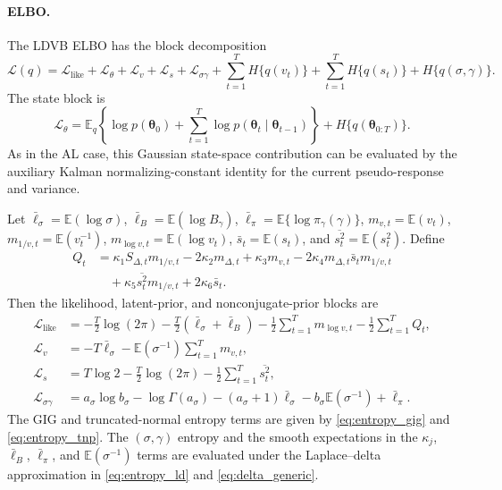 \documentclass[nojss,noheadings]{jss}
\renewcommand{\E}{\mathbb{E}}
\newcommand{\vect}[1]{\bm{#1}}
\newcommand{\elbo}{\mathcal{L}}
\newcommand{\pigamma}{\pi_\gamma}
\begin{document}
\paragraph{ELBO.}
The LDVB ELBO has the block decomposition
\begin{equation}
\elbo(q)=
\elbo_{\mathrm{like}}+\elbo_\theta+\elbo_v+\elbo_s+\elbo_{\sigma\gamma}
+\sum_{t=1}^TH\{q(v_t)\}
+\sum_{t=1}^TH\{q(s_t)\}
+H\{q(\sigma,\gamma)\}.
\label{eq:dyn_exdqlm_elbo}
\end{equation}
The state block is
\begin{equation}
\elbo_\theta
=\E_q\left\{\log p(\vect{\theta}_0)
+\sum_{t=1}^T\log p(\vect{\theta}_t\mid\vect{\theta}_{t-1})\right\}
+H\{q(\vect{\theta}_{0:T})\}.
\label{eq:dyn_exdqlm_elbo_theta}
\end{equation}
As in the AL case, this Gaussian state-space contribution can be evaluated by
the auxiliary Kalman normalizing-constant identity for the current
pseudo-response and variance.

Let
$\bar\ell_\sigma=\E(\log\sigma)$,
$\bar\ell_B=\E(\log B_\gamma)$,
$\bar\ell_{\pi}=\E\{\log\pigamma(\gamma)\}$,
$m_{v,t}=\E(v_t)$, $m_{1/v,t}=\E(v_t^{-1})$,
$m_{\log v,t}=\E(\log v_t)$, $\bar s_t=\E(s_t)$, and
$\overline{s_t^2}=\E(s_t^2)$. Define
\begin{align}
Q_t
&=
\kappa_1S_{\Delta,t}m_{1/v,t}
-2\kappa_2m_{\Delta,t}
+\kappa_3m_{v,t}
-2\kappa_4m_{\Delta,t}\bar s_t m_{1/v,t} \nonumber\\
&\quad
+\kappa_5\overline{s_t^2}m_{1/v,t}
+2\kappa_6\bar s_t.
\label{eq:dyn_exdqlm_elbo_Q}
\end{align}
Then the likelihood, latent-prior, and nonconjugate-prior blocks are
\begin{align}
\elbo_{\mathrm{like}}
&=
-\frac{T}{2}\log(2\pi)
-\frac{T}{2}(\bar\ell_\sigma+\bar\ell_B)
-\frac{1}{2}\sum_{t=1}^Tm_{\log v,t}
-\frac{1}{2}\sum_{t=1}^TQ_t,\\
\elbo_v
&=
-T\bar\ell_\sigma-\E(\sigma^{-1})\sum_{t=1}^Tm_{v,t},\\
\elbo_s
&=
T\log 2-\frac{T}{2}\log(2\pi)
-\frac{1}{2}\sum_{t=1}^T\overline{s_t^2},\\
\elbo_{\sigma\gamma}
&=
a_\sigma\log b_\sigma-\log\Gamma(a_\sigma)
-(a_\sigma+1)\bar\ell_\sigma
-b_\sigma\E(\sigma^{-1})
+\bar\ell_{\pi}.
\label{eq:dyn_exdqlm_elbo_terms}
\end{align}
The GIG and truncated-normal entropy terms are given by
\eqref{eq:entropy_gig} and \eqref{eq:entropy_tnp}. The
$(\sigma,\gamma)$ entropy and the smooth expectations in the $\kappa_j$,
$\bar\ell_B$, $\bar\ell_\pi$, and $\E(\sigma^{-1})$ terms are evaluated under
the Laplace--delta approximation in \eqref{eq:entropy_ld} and
\eqref{eq:delta_generic}.
\end{document}
